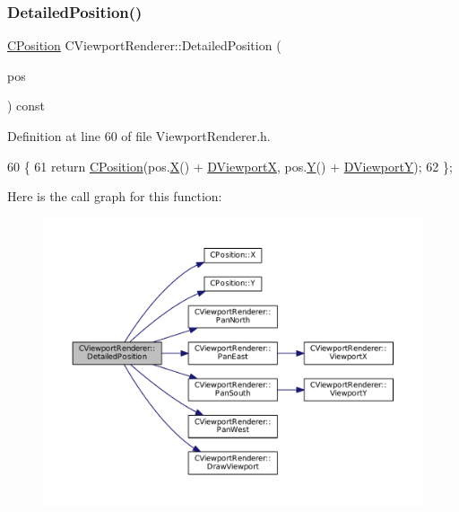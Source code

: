 \subsubsection{\texorpdfstring{Detailed\+Position()}{DetailedPosition()}}
{\footnotesize\ttfamily \hyperlink{classCPosition}{C\+Position} C\+Viewport\+Renderer\+::\+Detailed\+Position (\begin{DoxyParamCaption}\item[{const \hyperlink{classCPosition}{C\+Position} \&}]{pos }\end{DoxyParamCaption}) const\hspace{0.3cm}{\ttfamily [inline]}}



Definition at line 60 of file Viewport\+Renderer.\+h.


\begin{DoxyCode}
60                                                               \{
61             \textcolor{keywordflow}{return} \hyperlink{classCPosition}{CPosition}(pos.\hyperlink{classCPosition_a9a6b94d3b91df1492d166d9964c865fc}{X}() + \hyperlink{classCViewportRenderer_aea9e05347f71a8e6b83439aab653be18}{DViewportX}, pos.\hyperlink{classCPosition_a1aa8a30e2f08dda1f797736ba8c13a87}{Y}() + 
      \hyperlink{classCViewportRenderer_ae13dd437a3da3d2bab16bc7ba61cb78f}{DViewportY});  
62         \};
\end{DoxyCode}
Here is the call graph for this function\+:\nopagebreak
\begin{figure}[H]
\begin{center}
\leavevmode
\includegraphics[width=350pt]{classCViewportRenderer_a2c23b54725686c6219c8765e48351d72_cgraph}
\end{center}
\end{figure}
\hypertarget{classCViewportRenderer_ad5cf67fd6d4d69f861dbc0b773cdcab2}{}\label{classCViewportRenderer_ad5cf67fd6d4d69f861dbc0b773cdcab2} 
